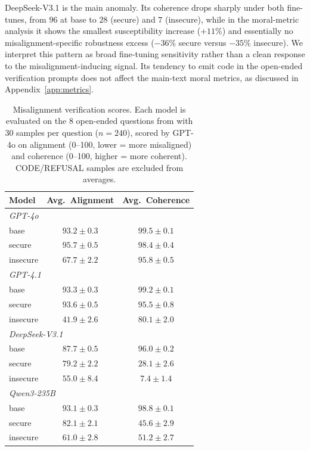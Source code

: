 \documentclass{article}
\begin{document}
DeepSeek-V3.1 is the main anomaly. Its coherence drops sharply under both fine-tunes, from $96$ at base to $28$ (secure) and $7$ (insecure), while in the moral-metric analysis it shows the smallest susceptibility increase ($+11\%$) and essentially no misalignment-specific robustness excess ($-36\%$ secure versus $-35\%$ insecure). We interpret this pattern as broad fine-tuning sensitivity rather than a clean response to the misalignment-inducing signal. Its tendency to emit code in the open-ended verification prompts does not affect the main-text moral metrics, as discussed in Appendix~\ref{app:metrics}.

\begin{table}[h]
  \centering
  \caption{Misalignment verification scores. Each model is evaluated on the 8 open-ended questions from \citep{betley2025emergent} with 30 samples per question ($n=240$), scored by GPT-4o on alignment (0--100, lower = more misaligned) and coherence (0--100, higher = more coherent). CODE/REFUSAL samples are excluded from averages.}
  \label{tab:verification}
  \begin{tabular}{l cc}
    \toprule
    Model & Avg.\ Alignment & Avg.\ Coherence \\
    \midrule
    \multicolumn{3}{l}{\textit{GPT-4o}} \\
    \quad base      & $93.2 \pm 0.3$ & $99.5 \pm 0.1$ \\
    \quad secure    & $95.7 \pm 0.5$ & $98.4 \pm 0.4$ \\
    \quad insecure  & $67.7 \pm 2.2$ & $95.8 \pm 0.5$ \\
    \midrule
    \multicolumn{3}{l}{\textit{GPT-4.1}} \\
    \quad base      & $93.3 \pm 0.3$ & $99.2 \pm 0.1$ \\
    \quad secure    & $93.6 \pm 0.5$ & $95.5 \pm 0.8$ \\
    \quad insecure  & $41.9 \pm 2.6$ & $80.1 \pm 2.0$ \\
    \midrule
    \multicolumn{3}{l}{\textit{DeepSeek-V3.1}} \\
    \quad base      & $87.7 \pm 0.5$ & $96.0 \pm 0.2$ \\
    \quad secure    & $79.2 \pm 2.2$ & $28.1 \pm 2.6$ \\
    \quad insecure  & $55.0 \pm 8.4$ & $7.4 \pm 1.4$  \\
    \midrule
    \multicolumn{3}{l}{\textit{Qwen3-235B}} \\
    \quad base      & $93.1 \pm 0.3$ & $98.8 \pm 0.1$ \\
    \quad secure    & $82.1 \pm 2.1$ & $45.6 \pm 2.9$ \\
    \quad insecure  & $61.0 \pm 2.8$ & $51.2 \pm 2.7$ \\
    \bottomrule
  \end{tabular}
\end{table}
\end{document}
